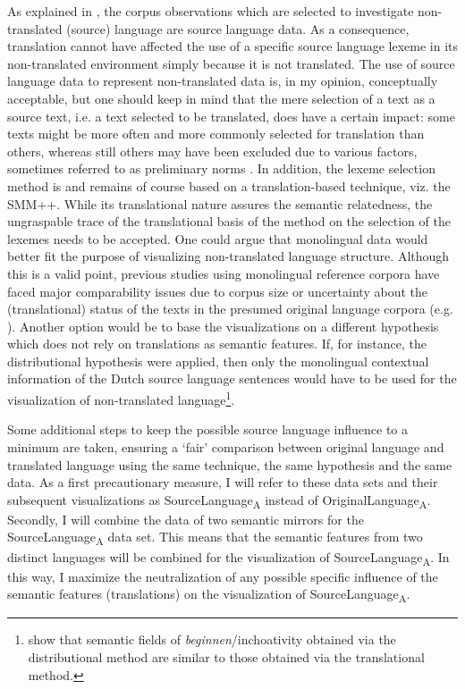 As explained in , the corpus observations which are selected to investigate non-translated (source) language are source language data. As a consequence, translation cannot have affected the use of a specific source language lexeme in its non-translated environment simply because it is not translated. The use of source language data to represent non-translated data is, in my opinion, conceptually acceptable, but one should keep in mind that the mere selection of a text as a source text, i.e. a text selected to be translated, does have a certain impact: some texts might be more often and more commonly selected for translation than others, whereas still others may have been excluded due to various factors, sometimes referred to as preliminary norms \citep{toury_descriptive_1995}. In addition, the lexeme selection method is and remains of course based on a translation-based technique, viz. the SMM++. While its translational nature assures the semantic relatedness, the ungraspable trace of the translational basis of the method on the selection of the lexemes needs to be accepted. One could argue that monolingual data would better fit the purpose of visualizing non-translated language structure. Although this is a valid point, previous studies using monolingual reference corpora have faced major comparability issues due to corpus size or uncertainty about the (translational) status of the texts in the presumed original language corpora (e.g. \citealt{musolff_conceptual_2014}). Another option would be to base the visualizations on a different hypothesis which does not rely on translations as semantic features. If, for instance, the distributional hypothesis were applied, then only the monolingual contextual information of the Dutch source language sentences would have to be used for the visualization of non-translated language\footnote{\citet{vandevoorde_distributional_2016} show that semantic fields of \textit{beginnen}/inchoativity obtained via the distributional method are similar to those obtained via the translational method.}.

Some additional steps to keep the possible source language influence to a minimum are taken, ensuring a ‘fair’ comparison between original language and translated language using the same technique, the same hypothesis and the same data. As a first precautionary measure, I will refer to these data sets and their subsequent visualizations as SourceLanguage\textsubscript{A} instead of OriginalLanguage\textsubscript{A}. Secondly, I will combine the data of two semantic mirrors for the SourceLanguage\textsubscript{A} data set. This means that the semantic features from two distinct languages will be combined for the visualization of SourceLanguage\textsubscript{A}. In this way, I maximize the neutralization of any possible specific influence of the semantic features (translations) on the visualization of SourceLanguage\textsubscript{A}.

